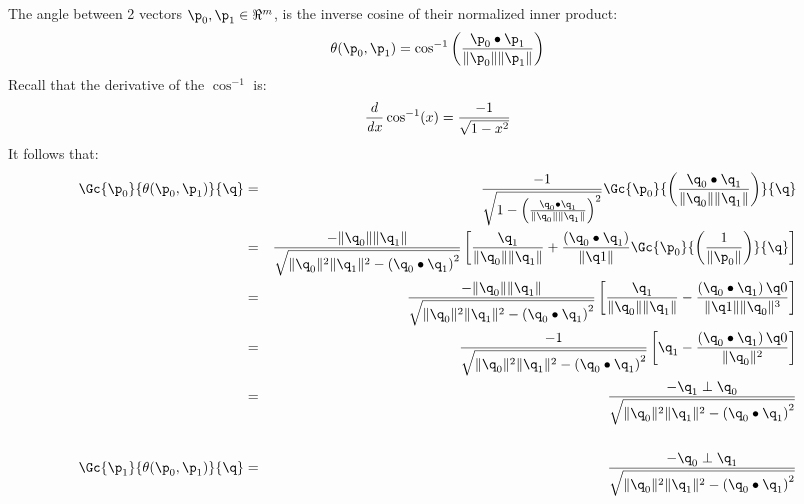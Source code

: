 The angle between 2 vectors $\p_0, \p_1 \in \Re^m$, is the inverse cosine
of their normalized inner product:
\begin{equation}
\theta(\p_0,\p_1)
=
\cos^{-1}
\left(
{ \p_0 \bullet \p_1 } \over {\|\p_0\| \|\p_1\|}
\right)
\end{equation}
Recall that the derivative of the $\cos^{-1}$ is:
\begin{equation}
\frac{d}{\mathit dx} \cos^{-1}(x) = { -1 \over \sqrt{1 - x^2} }
\end{equation}
It follows that:
\begin{eqnarray}
\label{eq:angle_gradient}
\Gc{\p_0}{\theta(\p_0,\p_1)}{\q}
& = &
{{-1} \over
{ \sqrt{1 - \left( {\q_0 \bullet \q_1} \over {\| \q_0 \| \| \q_1 \|} \right)^2 }}}
\Gc{\p_0}{\left( {\q_0 \bullet \q_1} \over {\| \q_0 \| \| \q_1 \|} \right)} {\q}
\\
& = &
{
{-\|\q_0\|\|\q_1\|}
\over
{ \sqrt{\|\q_0\|^2\|\q_1\|^2 - \left( \q_0 \bullet \q_1 \right)^2 }}
}
\left[
{{\q_1} \over {\|\q_0\|\|\q_1\|}}
+
{{\left( \q_0 \bullet \q_1 \right)} \over {\| \q1 \|}}
\Gc{\p_0}{\left( {1} \over {\| \p_0 \|} \right)} {\q}
\right]
\nonumber
\\
& = &
{
{-\|\q_0\|\|\q_1\|}
\over
{ \sqrt{\|\q_0\|^2\|\q_1\|^2 - \left( \q_0 \bullet \q_1 \right)^2 }}
}
\left[
{{\q_1} \over {\|\q_0\|\|\q_1\|}}
-
{{\left( \q_0 \bullet \q_1 \right) \q0} \over {\| \q1 \| \|\q_0\|^3}}
\right]
\nonumber
\\
& = &
{
{-1}
\over
{ \sqrt{\|\q_0\|^2\|\q_1\|^2 - \left( \q_0 \bullet \q_1 \right)^2 }}
}
\left[
\q_1
-
{{\left( \q_0 \bullet \q_1 \right) \q0} \over {\|\q_0\|^2}}
\right]
\nonumber
\\
& = &
{
{- \q_1 \perp \q_0}
\over
{ \sqrt{\|\q_0\|^2\|\q_1\|^2 - \left( \q_0 \bullet \q_1 \right)^2 }}
}
\nonumber
\\
&  &
\nonumber
\\
\Gc{\p_1}{\theta(\p_0,\p_1)}{\q}
& = &
{
{- \q_0 \perp \q_1}
\over
{ \sqrt{\|\q_0\|^2\|\q_1\|^2 - \left( \q_0 \bullet \q_1 \right)^2 }}
}
\nonumber
\end{eqnarray}
